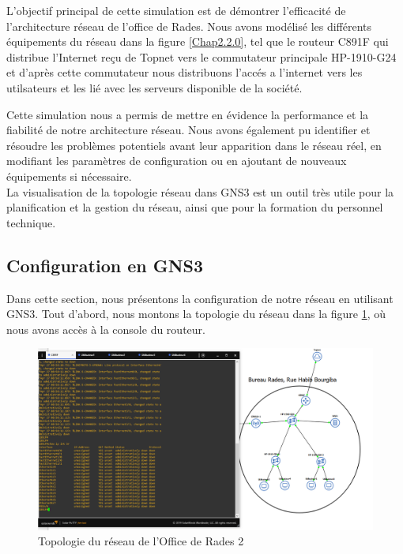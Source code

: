 L'objectif principal de cette simulation est de démontrer l'efficacité de l'architecture réseau de l'office de Rades. Nous avons modélisé les différents équipements du réseau dans la figure \ref{Chap2.2.0}, tel que le routeur C891F qui distribue l'Internet reçu de Topnet vers le commutateur principale HP-1910-G24 et d'après cette commutateur nous distribuons l'accés a l'internet vers les utilsateurs et les lié avec les serveurs disponible de la société.

Cette simulation nous a permis de mettre en évidence la performance et la fiabilité de notre architecture réseau. Nous avons également pu identifier et résoudre les problèmes potentiels avant leur apparition dans le réseau réel, en modifiant les paramètres de configuration ou en ajoutant de nouveaux équipements si nécessaire. \\

La visualisation de la topologie réseau dans GNS3 est un outil très utile pour la planification et la gestion du réseau, ainsi que pour la formation du personnel technique. \\



\subsection{Configuration en GNS3}

Dans cette section, nous présentons la configuration de notre réseau en utilisant GNS3. Tout d'abord, nous montons la topologie du réseau dans la figure \ref{Chap2.2.1}, où nous avons accès à la console du routeur. 


\begin{figure}[H]
 \centering
    \includegraphics[width=16cm]{Images/BRades-Topologie1.png}
    \caption{Topologie du réseau de l'Office de Rades 2}
    \label{Chap2.2.1}
\end{figure}


